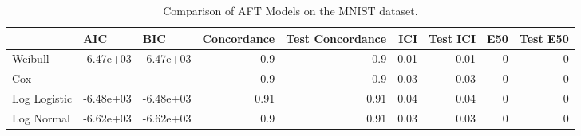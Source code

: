 \begin{table*}
\centering
\caption{Comparison of AFT Models on the MNIST dataset.}
\label{tab:mnist}
\begin{tabular}{lllrrrrrr}
\toprule
 & AIC & BIC & Concordance & Test Concordance & ICI & Test ICI & E50 & Test E50 \\
\midrule
Weibull & -6.47e+03 & -6.47e+03 & 0.9 & 0.9 & 0.01 & 0.01 & 0 & 0 \\
Cox & -- & -- & 0.9 & 0.9 & 0.03 & 0.03 & 0 & 0 \\
Log Logistic & -6.48e+03 & -6.48e+03 & 0.91 & 0.91 & 0.04 & 0.04 & 0 & 0 \\
Log Normal & -6.62e+03 & -6.62e+03 & 0.9 & 0.91 & 0.03 & 0.03 & 0 & 0 \\
\bottomrule
\end{tabular}
\end{table*}

